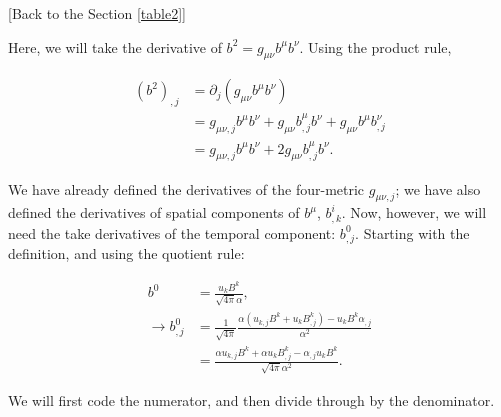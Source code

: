 \documentclass[landscape,letterpaper,10pt,english]{article}
\begin{document}
     {[}Back to the Section \ref{table2}{]}

Here, we will take the derivative of \(b^2 = g_{\mu\nu} b^\mu b^\nu\).
Using the product rule,

\begin{align}
\left(b^2\right)_{,j} &= \partial_j \left( g_{\mu\nu} b^\mu b^\nu \right) \\
                      &= g_{\mu\nu,j} b^\mu b^\nu + g_{\mu\nu} b^\mu_{,j} b^\nu + g_{\mu\nu} b^\mu b^\nu_{,j} \\
                      &= g_{\mu\nu,j} b^\mu b^\nu + 2 g_{\mu\nu} b^\mu_{,j} b^\nu.
\end{align}

We have already defined the derivatives of the four-metric
\(g_{\mu\nu,j}\); we have also defined the derivatives of spatial
components of \(b^\mu\), \(b^i_{,k}\). Now, however, we will need the
take derivatives of the temporal component: \(b^0_{,j}\). Starting with
the definition, and using the quotient rule:

\begin{align}
b^0 &= \frac{u_k B^k}{\sqrt{4\pi}\alpha}, \\
\rightarrow b^0_{,j} &= \frac{1}{\sqrt{4\pi}} \frac{\alpha \left( u_{k,j} B^k + u_k B^k_{,j} \right) - u_k B^k \alpha_{,j}}{\alpha^2} \\
    &= \frac{\alpha u_{k,j} B^k + \alpha u_k B^k_{,j} - \alpha_{,j} u_k B^k}{\sqrt{4\pi} \alpha^2}.
\end{align}

We will first code the numerator, and then divide through by the
denominator.
\end{document}
